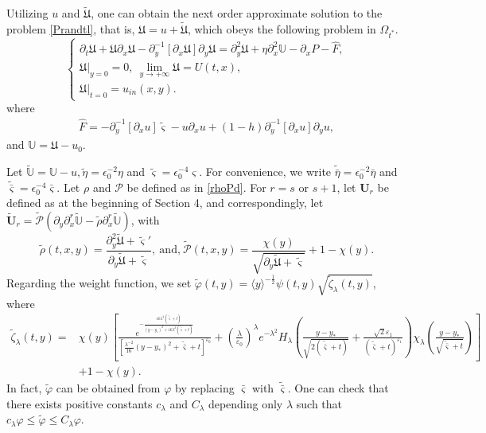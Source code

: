 \documentclass{amsart}
\numberwithin{equation}{section}
\newcommand\y{{{\langle y \rangle}}}
\begin{document}
Utilizing $u$ and $\tilde{\mathfrak{U}}$, one can obtain the next order approximate solution to the problem \eqref{Prandtl}, that is, $\mathfrak{U}=u+\tilde{\mathfrak{U}}$, which obeys the following problem in $\Omega_{t^{*}}$.
\begin{equation}\label{App+1}
\begin{cases}
\partial_{t}\mathfrak{U}
+\mathfrak{U}\partial_{x}\mathfrak{U}
-\partial_{y}^{-1}[\partial_{x}\mathfrak{U}]\partial_{y}\mathfrak{U}
=\partial_{y}^{2}\mathfrak{U}+\eta\partial_{x}^{2}\mathbb{U}-\partial_{x}P-\hat{F},\\
\mathfrak{U}|_{y=0}=0,~\lim\limits_{y\to+\infty}\mathfrak{U}=U(t,x),\\
\mathfrak{U}|_{t=0}=u_{in}(x,y).
\end{cases}
\end{equation}
where
\begin{align}\label{hatF}
\hat{F}=-\partial_{y}^{-1}[\partial_{x}u]\tilde{\varsigma}-u\partial_{x}u+(1-h)\partial_{y}^{-1}[\partial_{x}u]\partial_{y}u,
\end{align}
and $\mathbb{U}=\mathfrak{U}-u_{0}$.

Let $\tilde{\mathbb{U}}=\mathbb{U}-u, \tilde{\eta}=\epsilon_{0}^{-2}\eta$ and $\tilde{\varsigma}=\epsilon_{0}^{-4}\varsigma$. For convenience, we write $\tilde{\bar{\eta}}=\epsilon_{0}^{-2}\bar{\eta}$ and $\tilde{\bar{\varsigma}}=\epsilon_{0}^{-4}\bar{\varsigma}$.
Let $\rho$ and $\mathcal{P}$ be defined as in \eqref{rhoPd}.
For $r=s$ or $s+1$, let $\mathbf{U}_{r}$ be defined as at the beginning of Section 4, and correspondingly, let
$\tilde{\mathbf{U}}_{r}=\tilde{\mathcal{P}}\left(\partial_{y}\partial_{x}^{r}\tilde{\mathbb{U}}-\tilde{\rho}\partial_{x}^{r}\tilde{\mathbb{U}}\right)$,
with
$$\tilde\rho(t,x,y)=\frac{\partial_{y}^{2}\tilde{\mathfrak{U}}+\tilde{\varsigma}'}{\partial_{y}\tilde{\mathfrak{U}}+\tilde{\varsigma}},
~\text{and,}~
\tilde{\mathcal{P}}(t,x,y)=\frac{\chi(y)}{\sqrt{\partial_{y}\tilde{\mathfrak{U}}+\tilde{\varsigma}}}+1-\chi(y).$$
Regarding the weight function, we set $\tilde{\varphi}(t,y)=\y^{-\frac{1}{2}}\psi(t,y)\sqrt{\tilde{\zeta}_{\lambda}(t,y)}$, where
\begin{align*}
\tilde{\zeta}_{\lambda}(t,y)
=&\chi(y)\left[\frac{e^{-\frac{16\lambda^{4}(\tilde{\bar{\varsigma}}+t)}{(y-y_{*})^{2}+16\lambda^{2}(\tilde{\bar{\varsigma}}+t)}}}{[\frac{\lambda^{-2}}{16}(y-y_{*})^{2}+\tilde{\bar{\varsigma}}+t]^{\varepsilon_{0}}}
  +\left(\frac{\lambda}{\varepsilon_{0}}\right)^{\lambda}e^{-\lambda^{2}}H_{\lambda}\left(\frac{y-y_{*}}{\sqrt{2(\tilde{\bar{\varsigma}}+t)}}+\frac{\sqrt{2}\varepsilon_{1}}{(\tilde{\bar{\varsigma}}+t)^{\varepsilon_{1}}}\right)\chi_{\lambda}\left(\frac{y-y_{*}}{\sqrt{\tilde{\bar{\varsigma}}+t}}\right)\right]\\
 &+1-\chi(y).
\end{align*}
In fact, $\tilde{\varphi}$ can be obtained from $\varphi$ by replacing $\bar{\varsigma}$ with $\tilde{\bar{\varsigma}}$. One can check that there exists positive constants $c_{\lambda}$ and $C_{\lambda}$ depending only $\lambda$ such that
$c_{\lambda}\varphi\leq\tilde{\varphi}\leq C_{\lambda}\varphi$.
\end{document}
